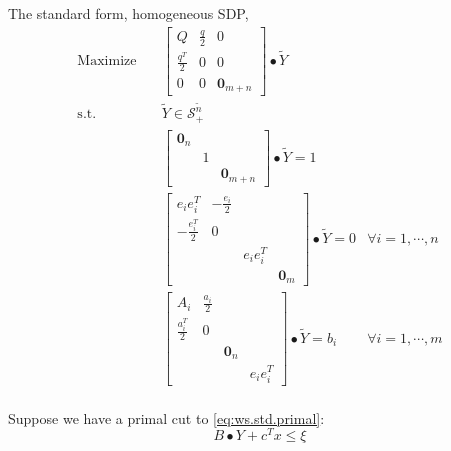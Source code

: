 \documentclass[../main]{subfiles}
\begin{document}
The standard form, homogeneous SDP,
\begin{equation}
    \begin{aligned}
        \mathrm{Maximize}\quad & \begin{bmatrix}
            Q & \frac{q}{2} & 0 \\ \frac{q^T}{2} & 0 & 0 \\ 0 & 0 & \bm 0_{m+n}
        \end{bmatrix} \bullet \tilde Y                               \\
        \mathrm{s.t.} \quad    & \tilde{Y}  \in \mathscr S^{\tilde{n}}_+                                   \\
                               & \begin{bmatrix}  \bm 0_n &  &  \\  & 1 &  \\  & & \bm 0_{m+n} \end{bmatrix} \bullet \tilde Y = 1                           \\
                               & \begin{bmatrix}
            e_ie_i^T         & -\frac{e_i}{2} &          &         \\
            -\frac{e_i^T}{2} & 0              &          &         \\
                             &                & e_ie_i^T &         \\
                             &                &          & \bm 0_m
        \end{bmatrix} \bullet \tilde Y = 0   & \forall i=1,\cdots, n \\
                               & \begin{bmatrix}
            A_i             & \frac{a_i}{2} &         &          \\
            \frac{a_i^T}{2} & 0             &         &          \\
                            &               & \bm 0_n &          \\
                            &               &         & e_ie_i^T
        \end{bmatrix}\bullet \tilde{Y} = b_i & \forall i=1,\cdots, m \\
    \end{aligned}
\end{equation}

Suppose we have a primal cut to \eqref{eq:ws.std.primal}:
\begin{equation*}
    B\bullet Y + c^T x \le \xi
\end{equation*}
\end{document}

